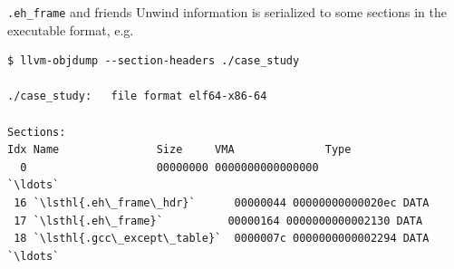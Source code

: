 \begin{frame}[fragile]{\texttt{.eh\_frame} and friends}
  Unwind information is serialized to some sections in the executable format, e.g.
  \vfill
  \begin{lstlisting}[style=c++]
$ llvm-objdump --section-headers ./case_study

./case_study:	file format elf64-x86-64

Sections:
Idx Name               Size     VMA              Type
  0                    00000000 0000000000000000
`\ldots`
 16 `\lsthl{.eh\_frame\_hdr}`      00000044 00000000000020ec DATA
 17 `\lsthl{.eh\_frame}`          00000164 0000000000002130 DATA
 18 `\lsthl{.gcc\_except\_table}`  0000007c 0000000000002294 DATA
`\ldots`
  \end{lstlisting}
\end{frame}

